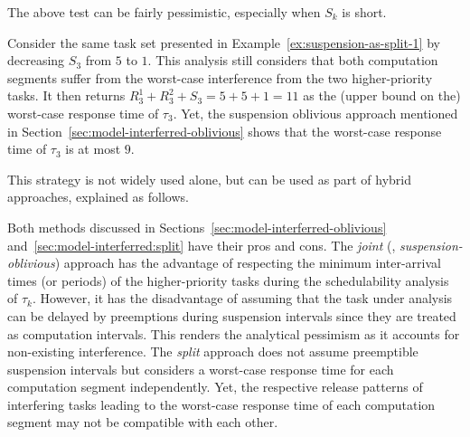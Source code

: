 The above test can be fairly pessimistic, especially when $S_k$ is short. 
\begin{example}
\label{ex:suspension-as-split-2}   
Consider the same task set presented in Example~\ref{ex:suspension-as-split-1} by decreasing $S_3$ from $5$ to $1$. This analysis still considers that both computation segments suffer from the worst-case interference from the two higher-priority tasks. It then returns $R_3^1 + R_3^2 + S_3 = 5 + 5 + 1 =11$ as the (upper bound on the) worst-case response time of $\tau_3$. Yet, the suspension oblivious approach mentioned in Section~\ref{sec:model-interferred-oblivious} shows that the worst-case response time of $\tau_3$ is at most $9$.
\hfill\myendproof  
\end{example} 

This strategy is not widely used alone, but can be used as part of hybrid approaches, explained as follows.

\label{sec:model-interferred-hybrid}

Both methods discussed in Sections~\ref{sec:model-interferred-oblivious} and~\ref{sec:model-interferred:split} have their pros and cons. The \emph{joint} (\ie, \emph{suspension-oblivious}) approach has the advantage of
respecting the minimum inter-arrival times (or periods) of the higher-priority tasks during the schedulability 
analysis of $\tau_k$. However, it has the disadvantage of assuming that the task under analysis can be delayed by preemptions during suspension intervals since they are treated as computation intervals. 
This renders the analytical pessimism as it accounts for non-existing interference. The \emph{split} approach does not assume  
preemptible suspension intervals but  considers a worst-case response time for each computation segment independently. Yet, the respective
release patterns of interfering tasks leading to the worst-case response time of each computation segment may not be compatible with each other.

